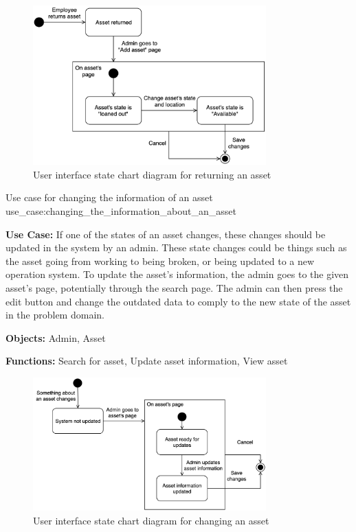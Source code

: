 \begin{figure}[H]
    \centering
    \includegraphics[width=0.8\textwidth]{figures/UseCases/UC_Return_asset.png}
    \caption{User interface state chart diagram for returning an asset}
    \label{fig:return_asset_statechart}
\end{figure}

    {Use case for changing the information of an asset}
    {use_case:changing_the_information_about_an_asset}
    {
        \textbf{Use Case:} If one of the states of an asset changes, these changes should be updated in the system by an admin. These state changes could be things such as the asset going from working to being broken, or being updated to a new operation system. To update the asset's information, the admin goes to the given asset's page, potentially through the search page. The admin can then press the edit button and change the outdated data to comply to the new state of the asset in the problem domain.
    
        \vskip 0.2cm
        
        \textbf{Objects:} Admin, Asset
        
        \vskip 0.2cm
        
        \textbf{Functions:} Search for asset, Update asset information, View asset
    }
    
\begin{figure}[H]
    \centering
    \includegraphics[width=0.8\textwidth]{figures/UseCases/UC_Change_asset.png}
    \caption{User interface state chart diagram for changing an asset}
    \label{fig:edit_asset_statechart}
\end{figure}

